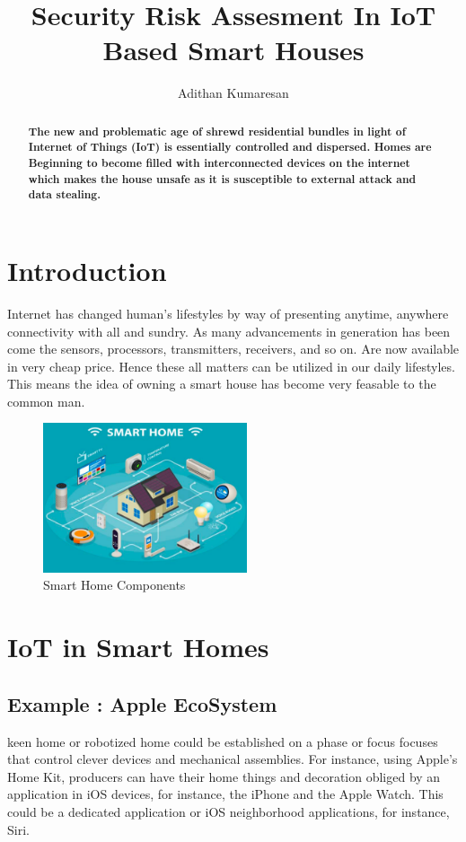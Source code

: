 \documentclass{article}
\title{Security Risk Assesment In IoT Based Smart Houses}
\author{Adithan Kumaresan}
\begin{document}
\maketitle

\begin{abstract}
\textbf{The new and problematic age of shrewd residential
bundles in light of
Internet of Things (IoT) is essentially controlled and dispersed.
Homes are Beginning to become filled with interconnected devices on the internet which makes the house unsafe as it is susceptible to external attack and data stealing.}
\end{abstract}


\section{Introduction}
Internet has changed human’s lifestyles by way of
presenting anytime, anywhere connectivity with all and
sundry. As many advancements in generation has been come the sensors, processors, transmitters, receivers, and so on.
Are now available in very cheap price. Hence these all
matters can be utilized in our daily lifestyles. 
This means the idea of owning a smart house has become very feasable to the common man.
\begin{figure}
\begin{center}
\includegraphics[width=6cm]{smarthome.png}
\end{center}
\caption{Smart Home Components}
\end{figure}
\section{IoT in Smart Homes}
\subsection{Example : Apple EcoSystem}
keen home or robotized home could be established on a phase
or focus focuses that control clever devices and mechanical
assemblies. For instance, using Apple's Home Kit, producers
can have their home things and decoration obliged by an
application in iOS devices, for instance, the iPhone and the
Apple Watch. This could be a dedicated application or iOS
neighborhood applications, for instance, Siri. 
\end{document}
